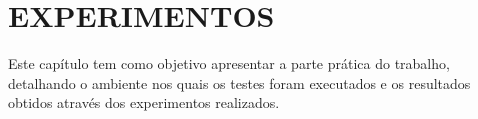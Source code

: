 \chapter{EXPERIMENTOS} \label{cha:experimentos}

Este capítulo tem como objetivo apresentar a parte prática do trabalho, detalhando o ambiente nos quais os testes foram executados e os resultados obtidos através dos experimentos realizados.


